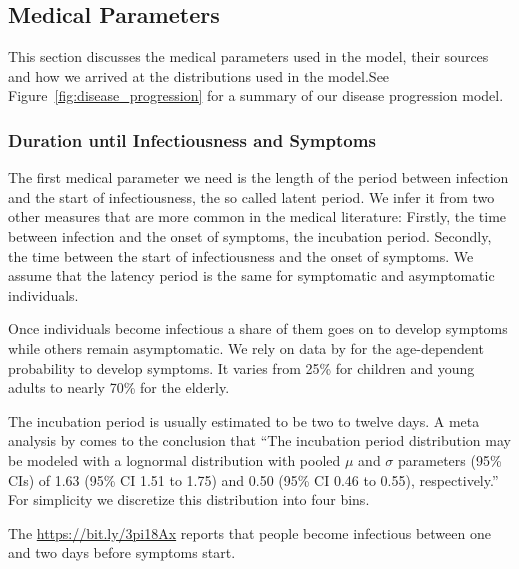 \subsection{Medical Parameters}
\label{sec:medical_params}

This section discusses the medical parameters used in the model, their sources and how we
arrived at the distributions used in the model.\footnotemark See
Figure~\ref{fig:disease_progression} for a summary of our disease progression model.


\subsubsection{Duration until Infectiousness and Symptoms}

The first medical parameter we need is the length of the period between infection and
the start of infectiousness, the so called latent period.
We infer it from two other measures that are more common in the medical literature:
Firstly, the time between infection and the onset of symptoms, the incubation period.
Secondly, the time between the start of infectiousness and the onset of symptoms.
We assume that the latency period is the same for symptomatic and asymptomatic individuals.

Once individuals become infectious a share of them goes on to develop symptoms while
others remain asymptomatic.
We rely on data by \cite{Davies2020} for the age-dependent probability to develop
symptoms. It varies from 25\% for children and young adults to nearly 70\% for the
elderly.

The incubation period is usually estimated to be two to twelve days.
A meta analysis by \citet{McAloon2020} comes to the conclusion that
``The incubation period distribution may be modeled with a lognormal distribution with
pooled $\mu$ and $\sigma$ parameters (95\% CIs) of 1.63 (95\% CI 1.51 to 1.75) and 0.50
(95\% CI 0.46 to 0.55), respectively.''
For simplicity we discretize this distribution into four bins.

The \href{European Centre for Disease Prevention and Control}{https://bit.ly/3pi18Ax}
reports that people become infectious between one and two days before symptoms start.\footnotemark

